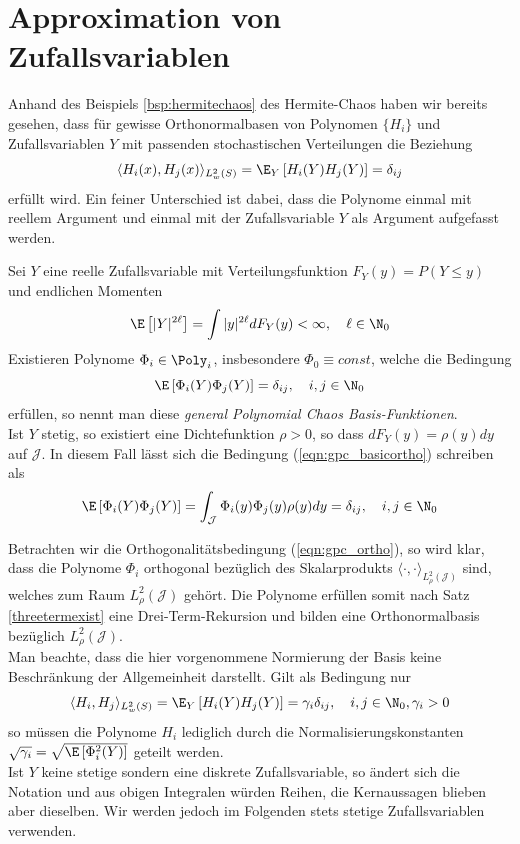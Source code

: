 \section{Approximation von Zufallsvariablen}
Anhand des Beispiels \ref{bsp:hermitechaos} des Hermite-Chaos haben wir bereits gesehen, dass für gewisse Orthonormalbasen von Polynomen $\lbrace H_i\rbrace$ und Zufallsvariablen $Y$ mit passenden stochastischen Verteilungen die Beziehung
\[\langle H_i(x),H_j(x)\rangle_{L_w^2(S)} =\E_Y \left[H_i(Y)H_j(Y)\right]=\delta_{ij}\]
erfüllt wird. Ein feiner Unterschied ist dabei, dass die Polynome einmal mit reellem Argument und einmal mit der Zufallsvariable $Y$ als Argument aufgefasst werden.
\begin{mathdef}
\label{def:gpc}
Sei $Y$ eine reelle Zufallsvariable mit Verteilungsfunktion $F_Y(y)=P(Y\le y)$ und endlichen Momenten
\[\E\left[|Y|^{2\ell}\right]=\int |y|^{2\ell}dF_Y(y)<\infty,\quad \ell\in \N_0\]
Existieren Polynome $\Phi_i\in\Poly_i$, insbesondere $\Phi_0\equiv const$, welche die Bedingung
\begin{equation}
\label{eqn:gpc_basicortho}
\E\left[\Phi_i(Y)\Phi_j(Y)\right]=\delta_{ij},\quad i,j\in\N_0
\end{equation}
erfüllen, so nennt man diese \emph{general Polynomial Chaos Basis-Funktionen}.\\
Ist $Y$ stetig, so existiert eine Dichtefunktion $\rho>0$, so dass $dF_Y(y)=\rho(y)dy$ auf $\mathcal{\mathcal{J}}$. In diesem Fall lässt sich die Bedingung (\ref{eqn:gpc_basicortho}) schreiben als
\begin{equation}
\label{eqn:gpc_ortho}
\E\left[\Phi_i(Y)\Phi_j(Y)\right]=\int_\mathcal{\mathcal{J}} \Phi_i(y)\Phi_j(y)\rho(y)dy=\delta_{ij},\quad i,j\in\N_0
\end{equation}
\end{mathdef}
\begin{mathbem}
Betrachten wir die Orthogonalitätsbedingung (\ref{eqn:gpc_ortho}), so wird klar, dass die Polynome $\Phi_i$ orthogonal bezüglich des Skalarprodukts $\langle \cdot,\cdot\rangle_{L_\rho^2(\mathcal{J})}$ sind, welches zum Raum $L_\rho^2(\mathcal{J})$ gehört. Die Polynome erfüllen somit nach Satz \ref{threetermexist} eine Drei-Term-Rekursion und bilden eine Orthonormalbasis bezüglich $L_\rho^2(\mathcal{\mathcal{J}})$.\\
Man beachte, dass die hier vorgenommene Normierung der Basis keine Beschränkung der Allgemeinheit darstellt. Gilt als Bedingung nur
\[\langle H_i,H_j\rangle_{L_w^2(S)} =\E_Y \left[H_i(Y)H_j(Y)\right]=\gamma_i\delta_{ij},\quad i,j\in\N_0,\gamma_i>0\]
so müssen die Polynome $H_i$ lediglich durch die Normalisierungskonstanten $\sqrt{\gamma_i}=\sqrt{\E\left[\Phi_i^2(Y)\right]}$ geteilt werden.\\
Ist $Y$ keine stetige sondern eine diskrete Zufallsvariable, so ändert sich die Notation und aus obigen Integralen würden Reihen, die Kernaussagen blieben aber dieselben. Wir werden jedoch im Folgenden stets stetige Zufallsvariablen verwenden.
\end{mathbem}
